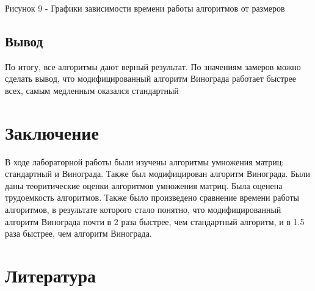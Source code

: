 \documentclass[12pt]{report}
\begin{document}
	\par
	Рисунок 9 - Графики зависимости времени работы алгоритмов от размеров
	\newline\newline
	
	\section*{Вывод}
	По итогу, все алгоритмы дают верный результат. По значениям замеров можно сделать вывод, что модифицированный алгоритм Винограда работает быстрее всех, самым медленным оказался стандартный
	
	\chapter*{Заключение}
	В ходе лабораторной работы были изучены алгоритмы умножения матриц: стандартный и Винограда. Также был модифицирован алгоритм Винограда. Были даны теоритические оценки алгоритмов умножения матриц. Была оценена трудоемкость алгоритмов. Также было произведено сравнение времени работы алгоритмов, в результате которого стало понятно, что модифицированный алгоритм Винограда почти в 2 раза быстрее, чем стандартный алгоритм, и в 1.5 раза быстрее, чем алгоритм Винограда.
	
	
	
	\chapter*{Литература}
	
\end{document}
